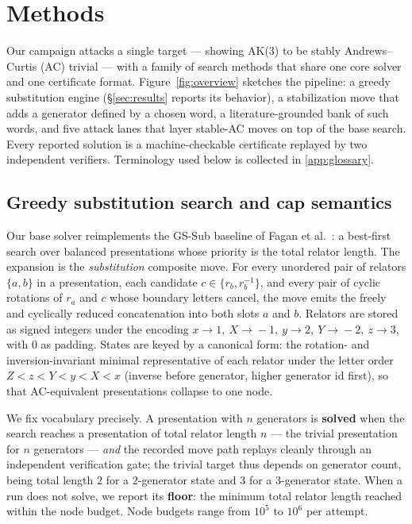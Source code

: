 \section{Methods}\label{sec:methods}

Our campaign attacks a single target --- showing AK(3) to be stably Andrews--Curtis (AC)
trivial --- with a family of search methods that share one core solver and one certificate
format. Figure~\ref{fig:overview} sketches the pipeline: a greedy substitution engine
(\S\ref{sec:results} reports its behavior), a stabilization move that adds a generator
defined by a chosen word, a literature-grounded bank of such words, and five attack lanes
that layer stable-AC moves on top of the base search. Every reported solution is a
machine-checkable certificate replayed by two independent verifiers. Terminology used
below is collected in \ref{app:glossary}.

\subsection{Greedy substitution search and cap semantics}

Our base solver reimplements the GS-Sub baseline of Fagan et al.~\cite{fagan2026twohump}:
a best-first search over balanced presentations whose priority is the total relator
length. The expansion is the \emph{substitution} composite move. For every unordered pair
of relators $\{a,b\}$ in a presentation, each candidate $c \in \{r_b, r_b^{-1}\}$, and
every pair of cyclic rotations of $r_a$ and $c$ whose boundary letters cancel, the move
emits the freely and cyclically reduced concatenation into both slots $a$ and $b$. Relators
are stored as signed integers under the encoding $x\!\to\!1,\ X\!\to\!-1,\ y\!\to\!2,\
Y\!\to\!-2,\ z\!\to\!3$, with $0$ as padding. States are keyed by a canonical form: the
rotation- and inversion-invariant minimal representative of each relator under the letter
order $Z<z<Y<y<X<x$ (inverse before generator, higher generator id first), so that
AC-equivalent presentations collapse to one node.

We fix vocabulary precisely. A presentation with $n$ generators is \textbf{solved} when
the search reaches a presentation of total relator length $n$ --- the trivial presentation
for $n$ generators --- \emph{and} the recorded move path replays cleanly through an
independent verification gate; the trivial target thus depends on generator count, being
total length $2$ for a $2$-generator state and $3$ for a $3$-generator state. When a run
does not solve, we report its \textbf{floor}: the minimum total relator length reached
within the node budget. Node budgets range from $10^5$ to $10^6$ per attempt.

